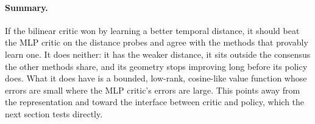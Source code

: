 \paragraph{Summary.}
If the bilinear critic won by learning a better temporal distance, it should beat the MLP
critic on the distance probes and agree with the methods that provably learn one. It does
neither: it has the weaker distance, it sits outside the consensus the other methods share,
and its geometry stops improving long before its policy does. What it does have is a
bounded, low-rank, cosine-like value function whose errors are small where the MLP critic's
errors are large. This points away from the representation and toward the interface between
critic and policy, which the next section tests directly.

